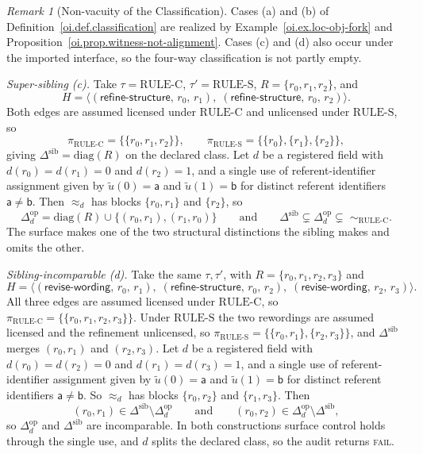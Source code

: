 \documentclass[11pt]{article}
\theoremstyle{plain}
\theoremstyle{definition}
\theoremstyle{remark}
\newtheorem{remark}[theorem]{Remark}
\newcommand{\RULEC}{\ensuremath{\mathrm{RULE\text{-}C}}}
\newcommand{\RULES}{\ensuremath{\mathrm{RULE\text{-}S}}}
\newcommand{\Ker}{\ensuremath{\mathrel{\approx_{d}}}}
\newcommand{\Dop}{\ensuremath{\Delta^{\mathrm{op}}_{d}}}
\newcommand{\Dsib}{\ensuremath{\Delta^{\mathrm{sib}}}}
\newcommand{\FAIL}{\textnormal{\textsc{fail}}}
\begin{document}
\begin{remark}[Non-vacuity of the Classification]
  \label{oi.rem.nonvacuity}
  Cases (a) and (b) of Definition~\ref{oi.def.classification}
  are realized by Example~\ref{oi.ex.loc-obj-fork}
  and Proposition~\ref{oi.prop.witness-not-alignment}.
  Cases (c) and (d) also occur under the imported interface,
  so the four-way classification is not partly empty.

  \emph{Super-sibling (c).}
  Take \(\tau=\RULEC\), \(\tau'=\RULES\),
  \(R=\{r_0,r_1,r_2\}\), and
  \[
    H
    =
    \bigl\langle
    (\textsf{refine-structure},\,r_0,\,r_1),\;
    (\textsf{refine-structure},\,r_0,\,r_2)
    \bigr\rangle.
  \]
  Both edges are assumed licensed under \RULEC{} and unlicensed under \RULES{},
  so
  \[
    \pi_{\RULEC}=\bigl\{\{r_0,r_1,r_2\}\bigr\},
    \qquad
    \pi_{\RULES}=\bigl\{\{r_0\},\{r_1\},\{r_2\}\bigr\},
  \]
  giving \(\Dsib=\mathrm{diag}(R)\) on the declared class.
  Let \(d\) be a registered field with
  \(d(r_0)=d(r_1)=0\) and \(d(r_2)=1\),
  and a single use of referent-identifier assignment
  given by \(\tilde{u}(0)=\mathsf{a}\) and \(\tilde{u}(1)=\mathsf{b}\)
  for distinct referent identifiers \(\mathsf{a}\neq\mathsf{b}\).
  Then \(\Ker\) has blocks \(\{r_0,r_1\}\) and \(\{r_2\}\), so
  \[
    \Dop
    =
    \mathrm{diag}(R)\cup\bigl\{(r_0,r_1),(r_1,r_0)\bigr\}
    \qquad\text{and}\qquad
    \Dsib\subsetneq\Dop\subsetneq\;\sim_{\RULEC}.
  \]
  The surface makes one of the two structural distinctions
  the sibling makes and omits the other.

  \emph{Sibling-incomparable (d).}
  Take the same \(\tau,\tau'\),
  with \(R=\{r_0,r_1,r_2,r_3\}\) and
  \[
    H
    =
    \bigl\langle
    (\textsf{revise-wording},\,r_0,\,r_1),\;
    (\textsf{refine-structure},\,r_0,\,r_2),\;
    (\textsf{revise-wording},\,r_2,\,r_3)
    \bigr\rangle.
  \]
  All three edges are assumed licensed under \RULEC{},
  so \(\pi_{\RULEC}=\bigl\{\{r_0,r_1,r_2,r_3\}\bigr\}\).
  Under \RULES{} the two rewordings are assumed licensed
  and the refinement unlicensed,
  so \(\pi_{\RULES}=\bigl\{\{r_0,r_1\},\{r_2,r_3\}\bigr\}\),
  and \(\Dsib\) merges \((r_0,r_1)\) and \((r_2,r_3)\).
  Let \(d\) be a registered field with
  \(d(r_0)=d(r_2)=0\) and \(d(r_1)=d(r_3)=1\),
  and a single use of referent-identifier assignment
  given by \(\tilde{u}(0)=\mathsf{a}\) and \(\tilde{u}(1)=\mathsf{b}\)
  for distinct referent identifiers \(\mathsf{a}\neq\mathsf{b}\).
  So \(\Ker\) has blocks \(\{r_0,r_2\}\) and \(\{r_1,r_3\}\).
  Then
  \[
    (r_0,r_1)\in\Dsib\setminus\Dop
    \qquad\text{and}\qquad
    (r_0,r_2)\in\Dop\setminus\Dsib,
  \]
  so \(\Dop\) and \(\Dsib\) are incomparable.
  In both constructions surface control holds through the single use,
  and \(d\) splits the declared class,
  so the audit returns \FAIL{}.
\end{remark}
\end{document}
